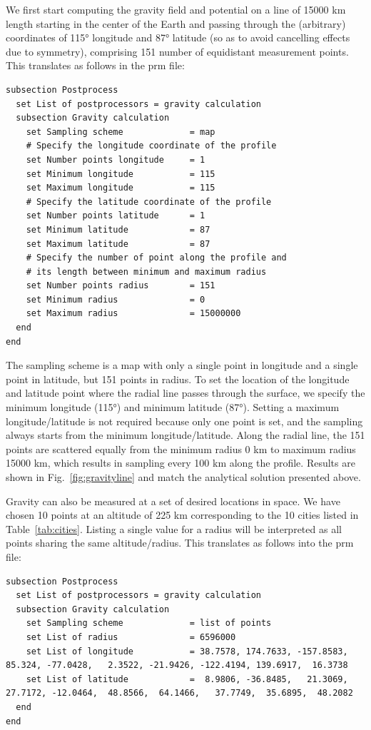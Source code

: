 We first start computing the gravity field and potential on a line 
of 15000 \si{km} length starting in the center of the Earth and passing through the (arbitrary) coordinates of 115\si{\degree} longitude and 87\si{\degree} latitude (so as to avoid cancelling effects due to symmetry), comprising 151 number of equidistant measurement points.
This translates as follows in the prm file:
\begin{lstlisting}
subsection Postprocess
  set List of postprocessors = gravity calculation
  subsection Gravity calculation
    set Sampling scheme             = map
    # Specify the longitude coordinate of the profile
    set Number points longitude     = 1
    set Minimum longitude           = 115
    set Maximum longitude           = 115
    # Specify the latitude coordinate of the profile
    set Number points latitude      = 1
    set Minimum latitude            = 87
    set Maximum latitude            = 87
    # Specify the number of point along the profile and 
    # its length between minimum and maximum radius
    set Number points radius        = 151
    set Minimum radius              = 0
    set Maximum radius              = 15000000
  end
end
\end{lstlisting}

The sampling scheme is a map with only a single point in longitude and a single point in latitude, but 151 points in radius. To set the location of the longitude and latitude point where the radial line passes through the surface, we specify the minimum longitude (115\si{\degree}) and minimum latitude (87\si{\degree}). Setting a maximum longitude/latitude is not required because only one point is set, and the sampling always starts from the minimum longitude/latitude. Along the radial line, the 151 points are scattered equally from the minimum radius 0 \si{km} to maximum radius 15000 \si{km}, which results in sampling every 100 \si{km} along the profile. Results are shown in Fig.~\ref{fig:gravityline} and match the analytical solution presented above. 

Gravity can also be measured at a set of desired locations in space. We have chosen 10 points at an altitude of 225 \si{km} corresponding to the 10 cities listed in Table~\ref{tab:cities}. Listing a single value for a radius will be interpreted as all points sharing the same altitude/radius. This translates as follows into the prm file:

\begin{lstlisting}
subsection Postprocess
  set List of postprocessors = gravity calculation
  subsection Gravity calculation
    set Sampling scheme             = list of points 
    set List of radius              = 6596000
    set List of longitude           = 38.7578, 174.7633, -157.8583,   85.324, -77.0428,   2.3522, -21.9426, -122.4194, 139.6917,  16.3738
    set List of latitude            =  8.9806, -36.8485,   21.3069,  27.7172, -12.0464,  48.8566,  64.1466,   37.7749,  35.6895,  48.2082 
  end
end
\end{lstlisting}

